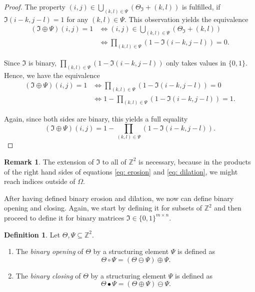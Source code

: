 \documentclass[a4paper,12pt]{article}
\theoremstyle{plain}
\theoremstyle{definition}
\newtheorem{definition}[theorem]{Definition}
\newtheorem{remark}[theorem]{Remark}
\begin{document}
\begin{proof}
	The property $(i, j) \in \bigcup_{(k, l) \in \Psi} ( \Theta_\mathfrak{I} + (k, l) )$ is fulfilled, if $\mathfrak{I}(i - k, j - l) = 1$ for any $(k, l) \in \Psi$. This observation yields the equivalence
	\begin{align*}
		(\mathfrak{I} \oplus \Psi)(i, j) = 1 &\Leftrightarrow (i, j) \in \bigcup_{(k, l) \in \Psi} ( \Theta_\mathfrak{I} + (k, l) ) \\
		&\Leftrightarrow \prod_{(k, l) \in \Psi} ( 1 - \mathfrak{I}(i - k, j - l) ) = 0.
	\end{align*}
	
	Since $\mathfrak{I}$ is binary, $\prod_{(k, l) \in \Psi} ( 1 - \mathfrak{I}(i - k, j - l) )$ only takes values in $\{ 0, 1 \}$. Hence, we have the equivalence
	\begin{align*}
		(\mathfrak{I} \oplus \Psi)(i, j) = 1 &\Leftrightarrow \prod_{(k, l) \in \Psi} ( 1 - \mathfrak{I}(i - k, j - l) ) = 0 \\
		&\Leftrightarrow 1 - \prod_{(k, l) \in \Psi} ( 1 - \mathfrak{I}(i - k, j - l) ) = 1.
	\end{align*}
	
	Again, since both sides are binary, this yields a full equality
	\begin{equation*}
		(\mathfrak{I} \oplus \Psi)(i, j) = 1 - \prod_{(k, l) \in \Psi} ( 1 - \mathfrak{I}(i - k, j - l) ).
	\end{equation*}
\end{proof}

\begin{remark}
	The extension of $\mathfrak{I}$ to all of $\mathbb{Z}^2$ is necessary, because in the products of the right hand sides of equations \eqref{eq: erosion} and \eqref{eq: dilation}, we might reach indices outside of $\Omega$.
\end{remark}

After having defined binary erosion and dilation, we now can define binary opening and closing. Again, we start by defining it for subsets of $\mathbb{Z}^2$ and then proceed to define it for binary matrices $\mathfrak{I} \in \{ 0, 1 \}^{m \times n}$.
\begin{definition}
	Let $\Theta, \Psi \subseteq \mathbb{Z}^2$.
	\begin{enumerate}
		\item The \emph{binary opening} of $\Theta$ by a structuring element $\Psi$ is defined as
		\begin{equation*}
			\Theta \circ \Psi = (\Theta \ominus \Psi) \oplus \Psi.
		\end{equation*}
		\item The \emph{binary closing} of $\Theta$ by a structuring element $\Psi$ is defined as
		\begin{equation*}
			\Theta \bullet \Psi = (\Theta \oplus \Psi) \ominus \Psi.
		\end{equation*}
	\end{enumerate}
\end{definition}
\end{document}
